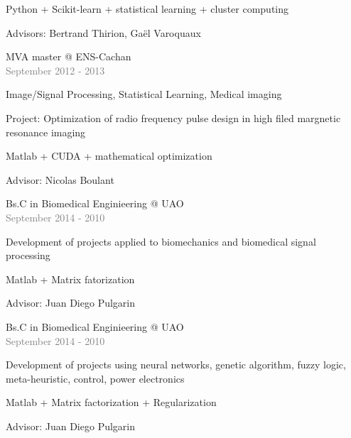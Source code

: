 \documentclass[letterpaper]{article}
\begin{document}
\begin{minipage}{1.\linewidth}
\begin{minipage}{0.47\linewidth}
\begin{minipage}{1\linewidth}
{		Python + Scikit-learn + statistical learning + cluster computing
		
		Advisors: Bertrand Thirion, Gaël Varoquaux}
	\end{minipage} %
	\begin{minipage}{1\linewidth} %
		\vspace{2ex}
		{\Large MVA master @ ENS-Cachan }\\
		{\small\textcolor{gray}{September 2012 - 2013}}
		
		{Image/Signal Processing, Statistical Learning, Medical imaging
		
		Project: Optimization of radio frequency pulse design in high filed 
		margnetic 
		resonance imaging
		
		Matlab + CUDA + mathematical optimization
		
		Advisor: Nicolas Boulant}
	\end{minipage} %
	\begin{minipage}{1\linewidth} %
		\vspace{2ex}
		{\Large Bs.C in Biomedical Enginieering @ UAO}\\
		{\small\textcolor{gray}{September 2014 - 2010}}
		
		{Development of projects applied to biomechanics and biomedical signal 
		processing
		
		Matlab + Matrix fatorization
		
		Advisor: Juan Diego Pulgarin}
	\end{minipage} %
	\begin{minipage}{1\linewidth} %
		\vspace{2ex}
		{\Large Bs.C in Biomedical Enginieering @ UAO}\\
		{\small\textcolor{gray}{September 2014 - 2010}}
		
		{Development of projects using neural networks, genetic algorithm, 
		fuzzy logic, 
		meta-heuristic, control, power electronics
		
		Matlab + Matrix factorization + Regularization
		
		Advisor: Juan Diego Pulgarin}\\
	\end{minipage} %
	\begin{minipage}{1\linewidth}
		\vspace{2ex}
	\end{minipage}
\end{minipage}
\end{minipage}
\end{document}
